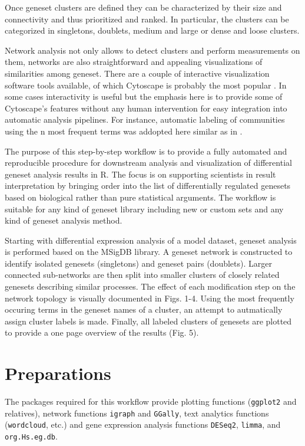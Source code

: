 \documentclass[9pt,a4paper,]{extarticle}
\begin{document}
Once geneset clusters are defined they can be characterized by their size and connectivity and thus prioritized and ranked. In particular, the clusters can be categorized in singletons, doublets, medium and large or dense and loose clusters.

Network analysis not only allows to detect clusters and perform measurements on them, networks are also straightforward and appealing visualizations of similarities among geneset. There are a couple of interactive visualization software tools available, of which Cytoscape is probably the most popular \citep{Shannon2003}. In some cases interactivity is useful but the emphasis here is to provide some of Cytoscape's features without any human intervention for easy integration into automatic analysis pipelines. For instance, automatic labeling of communities using the n most frequent terms was addopted here similar as in \citep{Kucera2016}.

The purpose of this step-by-step workflow is to provide a fully automated and reproducible procedure for downstream analysis and visualization of differential geneset analysis results in R. The focus is on supporting scientists in result interpretation by bringing order into the list of differentially regulated genesets based on biological rather than pure statistical arguments. The workflow is suitable for any kind of geneset library including new or custom sets and any kind of geneset analysis method.

Starting with differential expression analysis of a model dataset, geneset analysis is performed based on the MSigDB library. A geneset network is constructed to identify isolated genesets (singletons) and geneset pairs (doublets). Larger connected sub-networks are then split into smaller clusters of closely related genesets describing similar processes. The effect of each modification step on the network topology is visually documented in Figs. 1-4. Using the most frequently occuring terms in the geneset names of a cluster, an attempt to autmatically assign cluster labels is made. Finally, all labeled clusters of genesets are plotted to provide a one page overview of the results (Fig. 5).

\section{Preparations}\label{preparations}

The packages required for this workflow provide plotting functions (\texttt{ggplot2} and relatives), network functions \texttt{igraph}\citep{Csardi2006} and \texttt{GGally}, text analytics functions (\texttt{wordcloud}, etc.) and gene expression analysis functions \texttt{DESeq2}\citep{Love2014}, \texttt{limma}\citep{Ritchie2015}, and \texttt{org.Hs.eg.db}.
\end{document}
